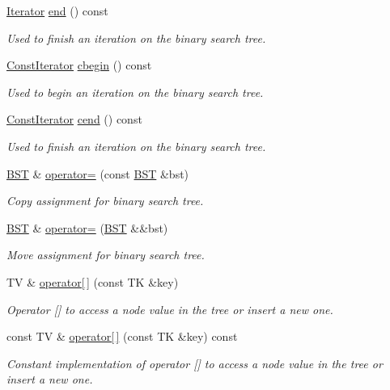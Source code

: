 \begin{DoxyCompactItemize}
\hyperlink{classBST_1_1Iterator}{Iterator} \hyperlink{classBST_a57b56c3f93a9816de6df6435966eacc5}{end} () const
\begin{DoxyCompactList}\small\item\em Used to finish an iteration on the binary search tree. \end{DoxyCompactList}\item 
\hyperlink{classBST_1_1ConstIterator}{Const\+Iterator} \hyperlink{classBST_a58c42a2fc86f0ed09f5d7a43b30d7704}{cbegin} () const
\begin{DoxyCompactList}\small\item\em Used to begin an iteration on the binary search tree. \end{DoxyCompactList}\item 
\hyperlink{classBST_1_1ConstIterator}{Const\+Iterator} \hyperlink{classBST_a3df704e278d2c00fe8ec1b41701e4712}{cend} () const
\begin{DoxyCompactList}\small\item\em Used to finish an iteration on the binary search tree. \end{DoxyCompactList}\item 
\hyperlink{classBST}{B\+ST} \& \hyperlink{classBST_ad5b24356902b7c8bbf265d1f6f683c81}{operator=} (const \hyperlink{classBST}{B\+ST} \&bst)
\begin{DoxyCompactList}\small\item\em Copy assignment for binary search tree. \end{DoxyCompactList}\item 
\hyperlink{classBST}{B\+ST} \& \hyperlink{classBST_ae2d6d6425760adec3ed7ee01244a2ca7}{operator=} (\hyperlink{classBST}{B\+ST} \&\&bst)
\begin{DoxyCompactList}\small\item\em Move assignment for binary search tree. \end{DoxyCompactList}\item 
TV \& \hyperlink{classBST_acc8b8d333853756891d31f14c2ea2259}{operator\mbox{[}$\,$\mbox{]}} (const TK \&key)
\begin{DoxyCompactList}\small\item\em Operator \mbox{[}\mbox{]} to access a node value in the tree or insert a new one. \end{DoxyCompactList}\item 
const TV \& \hyperlink{classBST_a45730a0b118f4a29b0c336c06069b7a3}{operator\mbox{[}$\,$\mbox{]}} (const TK \&key) const
\begin{DoxyCompactList}\small\item\em Constant implementation of operator \mbox{[}\mbox{]} to access a node value in the tree or insert a new one. \end{DoxyCompactList}\end{DoxyCompactItemize}
